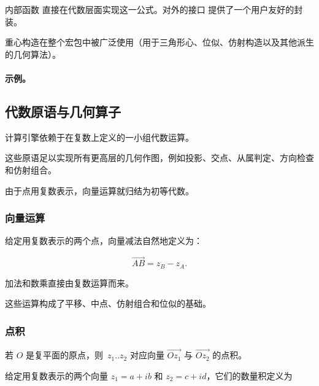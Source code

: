 \medskip
内部函数  直接在代数层面实现这一公式。对外的接口
 提供了一个用户友好的封装。

\medskip
重心构造在整个宏包中被广泛使用（用于三角形心、位似、仿射构造以及其他派生的几何算法）。

\paragraph{示例。}


\begin{tkzexample}[latex=.35\textwidth]
\begin{center}
\end{center}
\end{tkzexample}


\subsection{代数原语与几何算子}

计算引擎依赖于在复数上定义的一小组代数运算。

这些原语足以实现所有更高层的几何作图，例如投影、交点、从属判定、方向检查和仿射组合。

由于点用复数表示，向量运算就归结为初等代数。

\subsubsection{向量运算}

给定用复数表示的两个点，向量减法自然地定义为：

\[
\overrightarrow{AB} = z_B - z_A.
\]

加法和数乘直接由复数运算而来。

这些运算构成了平移、中点、仿射组合和位似的基础。


\subsubsection{点积}
若 \(O\) 是复平面的原点，则 \(\,z_1 .. z_2\) 对应向量 \(\overrightarrow{Oz_1}\) 与 \(\overrightarrow{Oz_2}\) 的点积。


给定用复数表示的两个向量 \(z_1 = a+ib\) 和 \(z_2 = c+id\)，它们的数量积定义为

